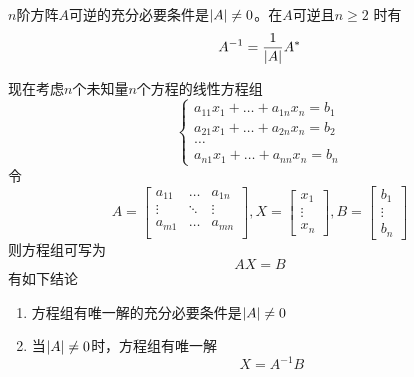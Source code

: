 \documentclass[11pt]{article}
\begin{document}
\begin{theorem}[]
\(n\)阶方阵\(A\)可逆的充分必要条件是\(\abs{A}\neq0\)。在\(A\)可逆且\(n\ge2\)
时有
\begin{equation*}
A^{-1}=\frac{1}{\abs{A}}A^*
\end{equation*}
\end{theorem}

现在考虑\(n\)个未知量\(n\)个方程的线性方程组
\begin{equation*}
\begin{cases}
a_{11}x_1+\dots+a_{1n}x_n=b_1\\
a_{21}x_1+\dots+a_{2n}x_n=b_2\\
\dots\\
a_{n1}x_1+\dots+a_{nn}x_n=b_n
\end{cases}
\end{equation*}
令
\begin{equation*}
A=
\begin{bmatrix}
a_{11}&\dots&a_{1n}\\
\vdots&\ddots&\vdots\\
a_{m1}&\dots&a_{mn}\\
\end{bmatrix},
X=
\begin{bmatrix}
x_1\\\vdots\\x_n
\end{bmatrix},
B=
\begin{bmatrix}
b_1\\\vdots\\b_n
\end{bmatrix}
\end{equation*}
则方程组可写为
\begin{equation*}
AX=B
\end{equation*}
有如下结论
\begin{enumerate}
\item 方程组有唯一解的充分必要条件是\(\abs{A}\neq0\)
\item 当\(\abs{A}\neq0\)时，方程组有唯一解
\begin{equation*}
X=A^{-1}B
\end{equation*}
\end{enumerate}
\end{document}
